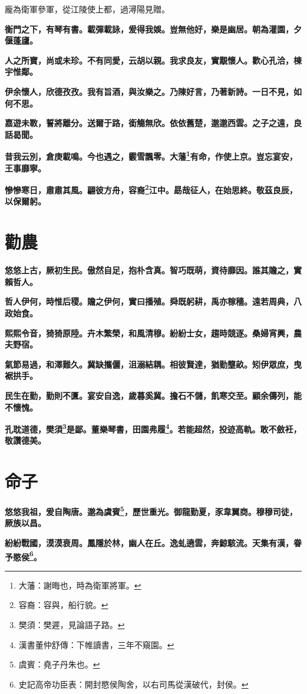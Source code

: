 \begin{quoting}龐為衛軍參軍，從江陵使上都，過潯陽見贈。\end{quoting}

\textbf{衡門之下，有琴有書。載彈載詠，爰得我娛。豈無他好，樂是幽居。朝為灌園，夕偃蓬廬。}

\textbf{人之所寶，尚或未珍。不有同愛，云胡以親。我求良友，實覯懷人。歡心孔洽，棟宇惟鄰。}

\textbf{伊余懷人，欣德孜孜。我有旨酒，與汝樂之。乃陳好言，乃著新詩。一日不見，如何不思。}

\textbf{嘉遊未斁，誓將離分。送爾于路，銜觴無欣。依依舊楚，邈邈西雲。之子之遠，良話曷聞。}

\textbf{昔我云別，倉庚載鳴。今也遇之，霰雪飄零。大藩\footnote{大藩：謝晦也，時為衛軍將軍。}有命，作使上京。豈忘宴安，王事靡寧。}

\textbf{慘慘寒日，肅肅其風。翩彼方舟，容裔\footnote{容裔：容與，船行貌。}江中。勗哉征人，在始思終。敬茲良辰，以保爾躬。}

\section{勸農}

\textbf{悠悠上古，厥初生民。傲然自足，抱朴含真。智巧既萌，資待靡因。誰其贍之，實賴哲人。}

\textbf{哲人伊何，時惟后稷。贍之伊何，實曰播殖。舜既躬耕，禹亦稼穡。遠若周典，八政始食。}

\textbf{熙熙令音，猗猗原陸。卉木繁榮，和風清穆。紛紛士女，趨時競逐。桑婦宵興，農夫野宿。}

\textbf{氣節易過，和澤難久。冀缺攜儷，沮溺結耦。相彼賢達，猶勤壟畝。矧伊眾庶，曳裾拱手。}

\textbf{民生在勤，勤則不匱。宴安自逸，歲暮奚冀。擔石不儲，飢寒交至。顧余儔列，能不懷愧。}

\textbf{孔耽道德，樊須\footnote{樊須：樊遲，見論語子路。}是鄙。董樂琴書，田園弗履\footnote{漢書董仲舒傳：下帷讀書，三年不窺園。}。若能超然，投迹高軌。敢不斂衽，敬讚德美。}

\section{命子}

\textbf{悠悠我祖，爰自陶唐。邈為虞賓\footnote{虞賓：堯子丹朱也。}，歷世重光。御龍勤夏，豕韋翼商。穆穆司徒，厥族以昌。}

\textbf{紛紛戰國，漠漠衰周。鳳隱於林，幽人在丘。逸虬遶雲，奔鯨駭流。天集有漢，眷予愍侯\footnote{史記高帝功臣表：開封愍侯陶舍，以右司馬從漢破代，封侯。}。}

